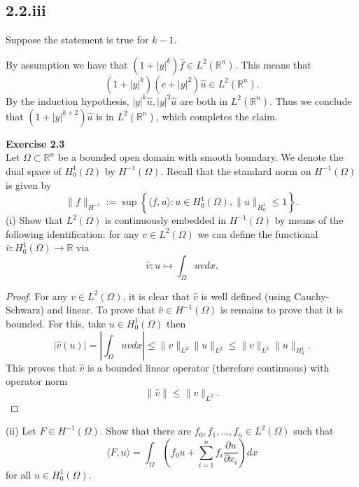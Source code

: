 \documentclass{article}
\newcommand{\R}{\mathbb{R}}
\begin{document}
\subsection*{2.2.iii}
Suppose the statement is true for $k-1$.\\
\par By assumption we have that $(1+|y|^k)\hat{f}\in L^2(\mathbb{R}^n)$. This means that 
\begin{equation*}
(1+|y|^k)(c+|y|^2)\hat{u}\in L^2(\mathbb{R}^n).
\end{equation*}
By the induction hypothesis,
$|y|^k\hat{u}, |y|^2\hat{u}$ are both in $L^2(\mathbb{R}^n)$. Thus we conclude that
$(1+|y|^{k+2})\hat{u}$ is in $L^2(\mathbb{R}^n)$, which completes the claim.

\textbf{Exercise 2.3}\\
Let $\Omega\subset\R^n$ be a bounded open domain with smooth boundary. We denote the dual space of $H_0^1(\Omega)$ by $H^{-1}(\Omega)$. Recall that the standard norm on $H^{-1}(\Omega)$ is given by
\[
\lVert f\rVert_{H^{-1}}:=\sup\left\{\langle f,u\rangle:u\in H_0^1(\Omega),\lVert u\rVert_{H_0^1}\leq 1\right\}.
\]
(i) Show that $L^2(\Omega)$ is continuously embedded in $H^{-1}(\Omega)$ by means of the following identification: for any $v\in L^2(\Omega)$ we can define the functional $\hat{v}:H_0^1(\Omega)\to\R$ via
\[
\hat{v}:u\mapsto\int_{\Omega}uvdx.
\]
\begin{proof}
    For any $v\in L^2(\Omega)$, it is clear that $\hat{v}$ is well defined (using Cauchy-Schwarz) and linear. To prove that $\hat{v}\in H^{-1}(\Omega)$ is remains to prove that it is bounded. For this, take $u\in H_0^1(\Omega)$ then
    \[
    |\hat{v}(u)|=\left|\int_{\Omega}uvdx\right|\leq\lVert v\rVert_{L^2}\lVert u\rVert_{L^2}\leq\lVert v\rVert_{L^2}\lVert u\rVert_{H_0^1}.
    \]
    This proves that $\hat{v}$ is a bounded linear operator (therefore continuous) with operator norm
    \[
    \lVert \hat{v}\rVert\leq\lVert v\rVert_{L^2}.
    \]
\end{proof}
(ii) Let $F\in H^{-1}(\Omega)$. Show that there are $f_0,f_1,\dots,f_n\in L^2(\Omega)$ such that 
\begin{equation}\label{eq}
\langle F,u\rangle=\int_{\Omega}\left(f_0u+\sum_{i=1}^nf_i\frac{\partial u}{\partial x_i}\right)dx
\end{equation}
for all $u\in H_0^1(\Omega)$.
\end{document}
